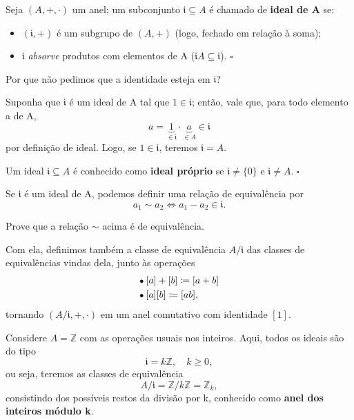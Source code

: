 \documentclass[../algebraIII_notes.tex]{subfiles}
\begin{document}
\begin{def*}
	Seja \((A, +, \cdot )\) um anel; um subconjunto \(\mathfrak{i}\subseteq A\) é chamado de \textbf{ideal de A} se:
	\begin{itemize}
		\item[1)] \((\mathfrak{i}, +)\) é um subgrupo de \((A, +)\) (logo, fechado em relação à soma);
		\item[2)] \(\mathfrak{i}\) \textit{absorve} produtos com elementos de A (\(\mathfrak{i}A \subseteq \mathfrak{i}\)). \(\square\)
	\end{itemize}
\end{def*}
\begin{tcolorbox}[
		skin=enhanced,
		title=Observação,
		fonttitle=\bfseries,
		colframe=black,
		colbacktitle=cyan!75!white,
		colback=cyan!15,
		colbacklower=black,
		coltitle=black,
		drop fuzzy shadow,
	]
	Por que não pedimos que a identidade esteja em \(\mathfrak{i}\)?

	Suponha que \(\mathfrak{i}\) é um ideal de A tal que \(1\in \mathfrak{i}\); então, vale que, para todo elemento a de A,
	\[
		a = \underbrace{1}_{\in \mathfrak{i}} \cdot \underbrace{a}_{\in A} \in \mathfrak{i}
	\]
	por definição de ideal. Logo, se \(1\in \mathfrak{i}\), teremos \(\mathfrak{i}=A\).
\end{tcolorbox}
\begin{def*}
	Um ideal \(\mathfrak{i}\subseteq A\) é conhecido como \textbf{ideal próprio} se \(\mathfrak{i}\neq\{0\}\) e \(\mathfrak{i}\neq A.\; \square\)
\end{def*}
Se \(\mathfrak{i} \) é um ideal de A, podemos definir uma relação de equivalência por
\[
	a_1 \sim  a_{2} \Longleftrightarrow a_{1}-a_{2}\in \mathfrak{i}.
\]
\begin{exr}
	Prove que a relação \(\sim \) acima é de equivalência.
\end{exr}
Com ela, definimos também a classe de equivalência \(A/\mathfrak{i}\) das classes de equivalências vindas dela, junto às operações
\begin{align*}
	 & \tikz[baseline=-0.5ex]\draw[black, fill=black, radius=1.5pt](0, 0)circle; \; [a]+[b]\coloneqq [a+b] \\
	 & \tikz[baseline=-0.5ex]\draw[black, fill=black, radius=1.5pt](0, 0)circle; \; [a][b]\coloneqq [ab],
\end{align*}
tornando \((A/\mathfrak{i}, +, \cdot )\) em um anel comutativo com identidade \([1]\).
\begin{example}
	Considere \(A = \mathbb{Z}\) com as operações usuais nos inteiros. Aqui, todos os ideais são do tipo
	\[
		\mathfrak{i} = k \mathbb{Z},\quad k\geq 0,
	\]
	ou seja, teremos as classes de equivalência
	\[
		A/\mathfrak{i} = \mathbb{Z}/k \mathbb{Z} = \mathbb{Z}_{k},
	\]
	consistindo dos possíveis restos da divisão por k, conhecido como \textbf{anel dos inteiros módulo k}.
\end{example}
\end{document}
